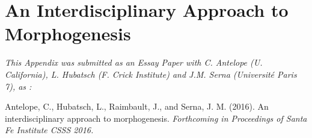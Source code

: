 
\chapter{An Interdisciplinary Approach to Morphogenesis} %

\label{app:syntheticdata} %


\textit{This Appendix was submitted as an Essay Paper with C. Antelope (U. California), L. Hubatsch (F. Crick Institute) and J.M. Serna (Université Paris 7), as : }

\noindent Antelope, C., Hubatsch, L., Raimbault, J., and Serna, J. M. (2016). An interdisciplinary approach to morphogenesis. \textit{Forthcoming in Proceedings of Santa Fe Institute CSSS 2016.}






